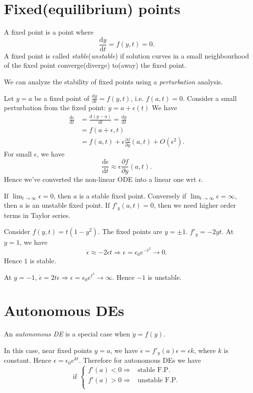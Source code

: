 \documentclass[10pt]{article}
\begin{document}
    \section{Fixed(equilibrium) points}
    \begin{definition}
        A fixed point is a point where
        \[
            \frac{\mathrm{d}y}{\mathrm{d}t}=f(y,t)=0 
        .\]
        A fixed point is called \textit{stable}(\textit{unstable}) if solution curves in a small neighbourhood of the fixed point converge(diverge) to(away) the fixed point.
    \end{definition}
    We can analyze the stability of fixed points using a \textit{perturbation} analysis.

    Let $y=a$ be a fixed point of $ \frac{\mathrm{d}y}{\mathrm{d}t}=f(y,t)  $, i.e. $ f(a,t)=0 $. Consider a small perturbation from the fixed point: $ y=a+\epsilon(t) $ We have 
    \[
        \begin{aligned}
            \frac{\mathrm{d}\epsilon}{\mathrm{d}t}&=\frac{\mathrm{d}(y-a)}{\mathrm{d}t}
            = \frac{\mathrm{d}y}{\mathrm{d}t}\\
            &=f(a+\epsilon,t)\\
            &= f(a,t)+\epsilon \frac{\partial f}{\partial y}(a,t)+O(\epsilon^2).
        \end{aligned}
    \]
    For small $ \epsilon $, we have 
    \[
        \frac{\mathrm{d}\epsilon}{\mathrm{d}t}\approx \epsilon \frac{\partial f}{\partial y}(a,t)  
    .\]
    Hence we've converted the non-linear ODE into a linear one wrt $ \epsilon $.

    If $ \lim_{t \to \infty} \epsilon=0 $, then $a$ is a stable fixed point. Conversely if $ \lim_{t \to \infty} \epsilon=\infty  $, then $a$ is an unstable fixed point. If $ f'_y(a,t)=0 $, then we need higher order terms in Taylor series.
    \begin{example}
        Consider $f(y,t)=t(1-y^2)$. The fixed points are $y=\pm 1$. $ f'_y=-2yt $. At $y=1$, we have 
        \[
            \dot{\epsilon}\approx -2\epsilon t \Rightarrow \epsilon=\epsilon_0 e^{-t^2}\to 0
        .\] 
        Hence $1$ is stable.
        
        At $y=-1$, $ \dot{\epsilon}=2t\epsilon \Rightarrow \epsilon=\epsilon_0e^{t^2}\to \infty $. Hence $-1$ is unstable.
    \end{example}
    \section{Autonomous DEs}
    \begin{definition}
        An \textit{autonomous DE} is a special case when $\dot{y}=f(y)$.
    \end{definition}
    In this case, near fixed points $ y=a$, we have $ \dot{\epsilon}=f'_y(a)\epsilon=\epsilon k $, where $k$ is constant. Hence $ \epsilon=\epsilon_0 e^{kt} $. Therefore for autonomous DEs we have 
    \[
      \text{if } \begin{cases}
      f'(a)<0 \Rightarrow &\text{stable F.P.}\\
       f'(a)>0 \Rightarrow &\text{unstable F.P.}\\
      \end{cases}   
    \]
\end{document}
